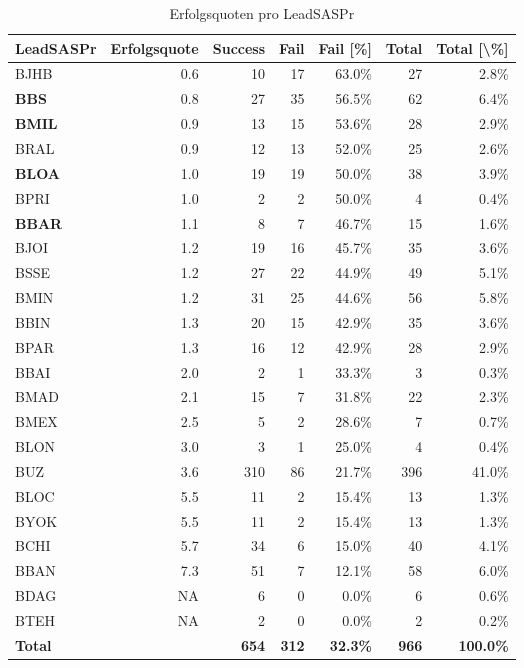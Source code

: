 \begin{table}[H]
	\centering
	\caption{Erfolgsquoten pro LeadSASPr}
	\begin{tabular}{lrrrrrr}
		\textbf{LeadSASPr} & \multicolumn{1}{l}{\textbf{Erfolgsquote}} & \multicolumn{1}{l}{\textbf{Success}} & \multicolumn{1}{l}{\textbf{Fail}} & \multicolumn{1}{l}{\textbf{Fail [\%]}} & \multicolumn{1}{l}{\textbf{Total}} & \multicolumn{1}{l}{\textbf{Total [\textbackslash{}\%]}} \\\hline
		BJHB  & 0.6   & 10    & 17    & 63.0\% & 27    & 2.8\% \\
		\textbf{BBS}   & 0.8   & 27    & 35    & 56.5\% & 62    & 6.4\% \\
		\textbf{BMIL}  & 0.9   & 13    & 15    & 53.6\% & 28    & 2.9\% \\
		BRAL  & 0.9   & 12    & 13    & 52.0\% & 25    & 2.6\% \\
		\textbf{BLOA}  & 1.0   & 19    & 19    & 50.0\% & 38    & 3.9\% \\
		BPRI  & 1.0   & 2     & 2     & 50.0\% & 4     & 0.4\% \\
		\textbf{BBAR}  & 1.1   & 8     & 7     & 46.7\% & 15    & 1.6\% \\
		BJOI  & 1.2   & 19    & 16    & 45.7\% & 35    & 3.6\% \\
		BSSE  & 1.2   & 27    & 22    & 44.9\% & 49    & 5.1\% \\
		BMIN  & 1.2   & 31    & 25    & 44.6\% & 56    & 5.8\% \\
		BBIN  & 1.3   & 20    & 15    & 42.9\% & 35    & 3.6\% \\
		BPAR  & 1.3   & 16    & 12    & 42.9\% & 28    & 2.9\% \\
		BBAI  & 2.0   & 2     & 1     & 33.3\% & 3     & 0.3\% \\
		BMAD  & 2.1   & 15    & 7     & 31.8\% & 22    & 2.3\% \\
		BMEX  & 2.5   & 5     & 2     & 28.6\% & 7     & 0.7\% \\
		BLON  & 3.0   & 3     & 1     & 25.0\% & 4     & 0.4\% \\
		BUZ   & 3.6   & 310   & 86    & 21.7\% & 396   & 41.0\% \\
		BLOC  & 5.5   & 11    & 2     & 15.4\% & 13    & 1.3\% \\
		BYOK  & 5.5   & 11    & 2     & 15.4\% & 13    & 1.3\% \\
		BCHI  & 5.7   & 34    & 6     & 15.0\% & 40    & 4.1\% \\
		BBAN  & 7.3   & 51    & 7     & 12.1\% & 58    & 6.0\% \\
		BDAG  & \multicolumn{1}{r}{NA} & 6     & 0     & 0.0\% & 6     & 0.6\% \\
		BTEH  & \multicolumn{1}{r}{NA} & 2     & 0     & 0.0\% & 2     & 0.2\% \\\hline
		\textbf{Total} &       & \textbf{654} & \textbf{312} & \textbf{32.3\%} & \textbf{966} & \textbf{100.0\%} \\
	\end{tabular}%
	\label{fleadsas}%
\end{table}%
